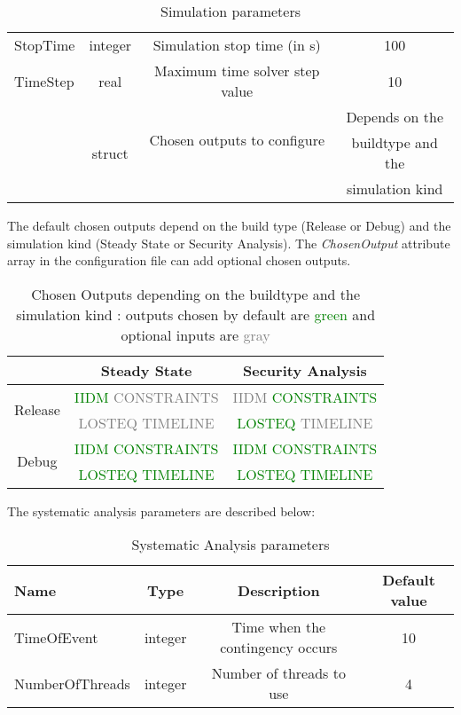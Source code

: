 \documentclass[a4paper, 12pt]{report}
\begin{document}
\begin{table}[H]
\begin{tabular}{ l | c | c | c }
\rowcolor{white}
\small{StopTime} & \small{integer} & \small{Simulation stop time (in s)} & \small{100} \\
\rowcolor{gray!10}
\small{TimeStep} & \small{real} & \small{Maximum time solver step value} & \small{10} \\
\rowcolor{white}
\multirow{3}{*}{\small{ChosenOutputs}} & \multirow{3}{*}{\small{struct}} & \multirow{2}{*}{\small{Chosen outputs to configure}} & \small{Depends on the} \\
& & \multirow{2}{*}{\small{the .jobs file}} & \small{buildtype and the} \\
& & & \small{simulation kind} \\
\bottomrule
\end{tabular}
\caption{Simulation parameters}
\end{table}

\begin{table}[H]
The default chosen outputs depend on the build type (Release or Debug) and the simulation kind (Steady State or Security Analysis). The \textit{ChosenOutput} attribute array in the configuration file can add optional chosen outputs.
\center
\begin{tabular}{| c | c | c |}
\cline{2-3}
\multicolumn{1}{c|}{} & Steady State & Security Analysis \\
\hline
\multirow{2}{*}{Release} & \textcolor{green}{\small{IIDM} \textcolor{gray}{CONSTRAINTS}} & \small{\textcolor{gray}{IIDM} \textcolor{green}{CONSTRAINTS}} \\
& \small{\textcolor{gray}{LOSTEQ}} \textcolor{gray}{TIMELINE} & \small{\textcolor{green}{LOSTEQ} \textcolor{gray}{TIMELINE}} \\
\hline
\multirow{2}{*}{Debug} & \textcolor{green}{\small{IIDM CONSTRAINTS}} & \textcolor{green}{\small{IIDM CONSTRAINTS}} \\
& \textcolor{green}{\small{LOSTEQ TIMELINE}} & \textcolor{green}{\small{LOSTEQ TIMELINE}} \\
\hline
\end{tabular}
\caption{Chosen Outputs depending on the buildtype and the simulation kind : outputs chosen by default are \textcolor{green}{green} and optional inputs are \textcolor{gray}{gray}}
\end{table}

The systematic analysis parameters are described below:

\begin{table}[H]
\center
\begin{tabular}{ l | c | c | c }
\toprule
\textbf{{Name}} & \textbf{{Type}} & \textbf{{Description}} & \textbf{{Default value}}\\
\midrule
\rowcolor{white}
TimeOfEvent & integer & Time when the contingency occurs & 10 \\
\rowcolor{gray!10}
NumberOfThreads & integer & Number of threads to use & 4 \\
\bottomrule
\end{tabular}
\caption{Systematic Analysis parameters}
\end{table}
\end{document}
